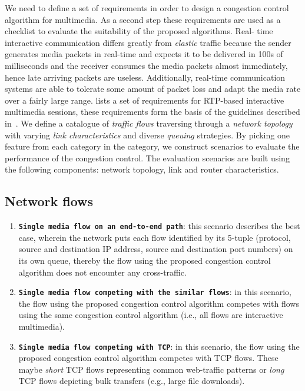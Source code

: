 We need to define a set of requirements in order to design a congestion
control algorithm for multimedia. As a second step these requirements are used
as a checklist to evaluate the suitability of the proposed algorithms. Real-
time interactive communication differs greatly from \emph{elastic} traffic
because the sender generates media packets in real-time and expects it to be
delivered in 100s of milliseconds and the receiver consumes the media packets
almost immediately, hence late arriving packets are useless. Additionally,
real-time communication systems are able to tolerate some amount of packet
loss and adapt the media rate over a fairly large range.
\cite{draft.rmcat.req} lists a set of requirements for RTP-based interactive
multimedia sessions, these requirements form the basis of the guidelines
described in~\cite{draft.rmcat.evaluate}.  We define a catalogue of
\emph{traffic flows} traversing through a \emph{network topology} with varying
\emph{link characteristics} and diverse \emph{queuing} strategies. By picking
one feature from each category in the category, we construct scenarios to
evaluate the performance of the congestion control. The evaluation scenarios
are built using the following components: network topology, link and router
characteristics.

\subsection{Network flows}

\begin{enumerate}
\setlength{\itemsep}{0pt}

\item \textbf{\texttt{Single media flow on an end-to-end path}}: this scenario
describes the best case, wherein the network puts each flow identified by its
5-tuple (protocol, source and destination IP address, source and destination
port numbers) on its own queue, thereby the flow using the proposed congestion
control algorithm does not encounter any cross-traffic.

\item \textbf{\texttt{Single media flow competing with the similar flows}}: in
this scenario, the flow using the proposed congestion control algorithm
competes with flows using the same congestion control algorithm (i.e., all
flows are interactive multimedia).


\item \textbf{\texttt{Single media flow competing with TCP}}: in this
scenario, the flow using the proposed congestion control algorithm competes
with TCP flows. These maybe \emph{short} TCP flows representing common
web-traffic patterns or \emph{long} TCP flows depicting bulk transfers (e.g.,
large file downloads).

\end{enumerate}

